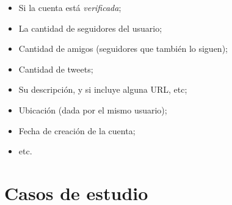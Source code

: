 \begin{itemize}
\item Si la cuenta está \emph{verificada};
\item La cantidad de seguidores del usuario;
\item Cantidad de amigos (seguidores que también lo siguen);
\item Cantidad de tweets;
\item Su descripción, y si incluye alguna URL, etc;
\item Ubicación (dada por el mismo usuario);
\item Fecha de creación de la cuenta;
\item etc.
\end{itemize}
\section{Casos de estudio}
\label{sec-1.4}
